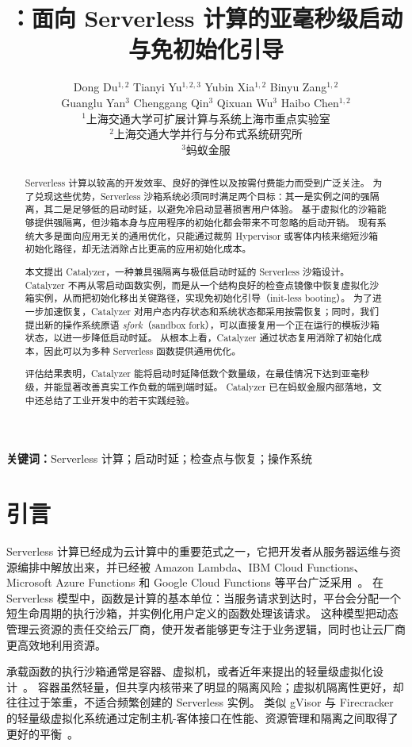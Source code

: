 \documentclass[letterpaper,twocolumn,10pt]{article}
\title{\sys{}：面向 Serverless 计算的亚毫秒级启动与免初始化引导}
\author{
Dong Du$^{1,2}$ \quad Tianyi Yu$^{1,2,3}$ \quad Yubin Xia$^{1,2}$ \quad Binyu Zang$^{1,2}$\\
Guanglu Yan$^{3}$ \quad Chenggang Qin$^{3}$ \quad Qixuan Wu$^{3}$ \quad Haibo Chen$^{1,2}$\\[0.5em]
$^{1}$上海交通大学可扩展计算与系统上海市重点实验室\\
$^{2}$上海交通大学并行与分布式系统研究所\\
$^{3}$蚂蚁金服
}
\date{}
\newcommand{\sys}{Catalyzer}
\begin{document}
\pagestyle{empty}
\maketitle

\begin{abstract}
Serverless 计算以较高的开发效率、良好的弹性以及按需付费能力而受到广泛关注。
为了兑现这些优势，Serverless 沙箱系统必须同时满足两个目标：其一是实例之间的强隔离，其二是足够低的启动时延，以避免冷启动显著损害用户体验。
基于虚拟化的沙箱能够提供强隔离，但沙箱本身与应用程序的初始化都会带来不可忽略的启动开销。
现有系统大多是面向应用无关的通用优化，只能通过裁剪 Hypervisor 或客体内核来缩短沙箱初始化路径，却无法消除占比更高的应用初始化成本。

本文提出 \sys{}，一种兼具强隔离与极低启动时延的 Serverless 沙箱设计。
\sys{} 不再从零启动函数实例，而是从一个结构良好的检查点镜像中恢复虚拟化沙箱实例，从而把初始化移出关键路径，实现免初始化引导（init-less booting）。
为了进一步加速恢复，\sys{} 对用户态内存状态和系统状态都采用按需恢复；同时，我们提出新的操作系统原语 \emph{sfork}（sandbox fork），可以直接复用一个正在运行的模板沙箱状态，以进一步降低启动时延。
从根本上看，\sys{} 通过状态复用消除了初始化成本，因此可以为多种 Serverless 函数提供通用优化。

评估结果表明，\sys{} 能将启动时延降低数个数量级，在最佳情况下达到亚毫秒级，并能显著改善真实工作负载的端到端时延。
\sys{} 已在蚂蚁金服内部落地，文中还总结了工业开发中的若干实践经验。
\end{abstract}

\vspace{0.3em}
\noindent\textbf{关键词：}Serverless 计算；启动时延；检查点与恢复；操作系统

\section{引言}\label{sec:intro}
Serverless 计算已经成为云计算中的重要范式之一，它把开发者从服务器运维与资源编排中解放出来，并已经被 Amazon Lambda、IBM Cloud Functions、Microsoft Azure Functions 和 Google Cloud Functions 等平台广泛采用~\cite{r2,r1,r3,r7}。
在 Serverless 模型中，函数是计算的基本单位：当服务请求到达时，平台会分配一个短生命周期的执行沙箱，并实例化用户定义的函数处理该请求。
这种模型把动态管理云资源的责任交给云厂商，使开发者能够更专注于业务逻辑，同时也让云厂商更高效地利用资源。

承载函数的执行沙箱通常是容器、虚拟机，或者近年来提出的轻量级虚拟化设计~\cite{r1,r20,r44,r6,r8,r19,r35,r37,r41,r45}。
容器虽然轻量，但共享内核带来了明显的隔离风险；虚拟机隔离性更好，却往往过于笨重，不适合频繁创建的 Serverless 实例。
类似 gVisor 与 Firecracker 的轻量级虚拟化系统通过定制主机-客体接口在性能、资源管理和隔离之间取得了更好的平衡~\cite{r8,r6}。
\end{document}
